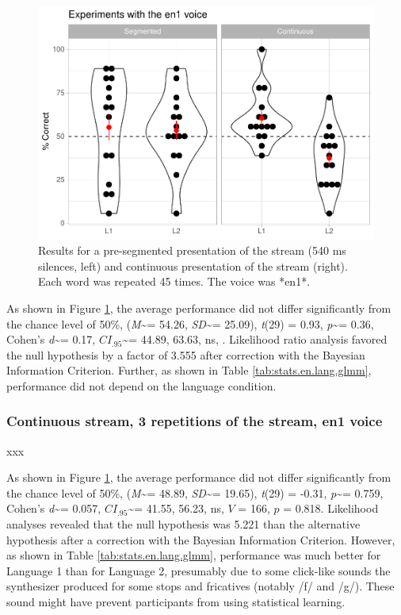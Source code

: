 \documentclass[
]{article}
\newcommand{\T}{{\em t\/}}
\newcommand{\p}{{\em p\/}}
\newcommand{\M}{{\em M\/}}
\newcommand{\SD}{{\em SD\/}}
\newcommand{\D}{Cohen's {\em d\/}}
\newcommand{\CI}{$CI_{.95}$}
\begin{document}
\begin{figure}

{\centering \includegraphics[width=0.8\linewidth]{segmentation_recall_combined_for_revision_files/figure-latex/stats-london-stats.3x.en.segm-cont.plot-1} 

}

\caption{Results for a pre-segmented presentation of the stream (540 ms silences, left) and continuous presentation of the stream (right). Each word was repeated 45 times. The voice was *en1*.}\label{fig:stats-london-stats.3x.en.segm-cont.plot}
\end{figure}

As shown in Figure \ref{fig:stats-london-stats.3x.en.segm-cont.plot},
the average performance did not differ significantly from the chance
level of 50\%, (\M\textasciitilde= 54.26, \SD\textasciitilde= 25.09),
\T(29) = 0.93, \p\textasciitilde= 0.36, \D\textasciitilde= 0.17,
\CI\textasciitilde= 44.89, 63.63, ns, . Likelihood ratio analysis
favored the null hypothesis by a factor of 3.555 after correction with
the Bayesian Information Criterion. Further, as shown in Table
\ref{tab:stats.en.lang.glmm}, performance did not depend on the language
condition.

\hypertarget{continuous-stream-3-repetitions-of-the-stream-en1-voice}{%
\subsubsection{Continuous stream, 3 repetitions of the stream, en1
voice}\label{continuous-stream-3-repetitions-of-the-stream-en1-voice}}

xxx

As shown in Figure \ref{fig:stats-london-stats.3x.en.segm-cont.plot},
the average performance did not differ significantly from the chance
level of 50\%, (\M\textasciitilde= 48.89, \SD\textasciitilde= 19.65),
\T(29) = -0.31, \p\textasciitilde= 0.759, \D\textasciitilde= 0.057,
\CI\textasciitilde= 41.55, 56.23, ns, \(V\) = 166, \(p\) = 0.818.
Likelihood analyses revealed that the null hypothesis was 5.221 than the
alternative hypothesis after a correction with the Bayesian Information
Criterion. However, as shown in Table \ref{tab:stats.en.lang.glmm},
performance was much better for Language 1 than for Language 2,
presumably due to some click-like sounds the synthesizer produced for
some stops and fricatives (notably /f/ and /g/). These sound might have
prevent participants from using statistical learning.
\end{document}
